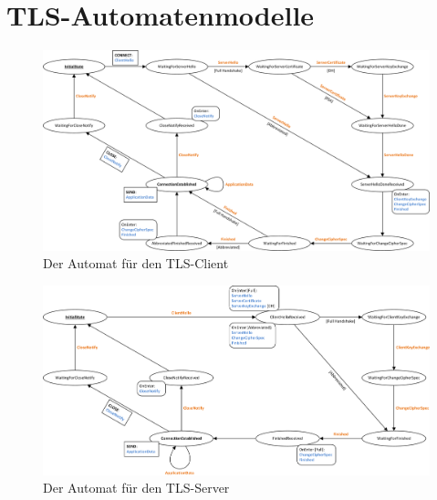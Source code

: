 \appendix

\chapter{TLS-Automatenmodelle}
\label{cha_tls_state_machines}

\begin{figure}[H]
	\centering
	\includegraphics[scale=0.75, angle = 90]{Diagrams/client_state_machine.png} %
	\caption{Der Automat für den TLS-Client}
	\label{fig_tls_client_state_machine}
\end{figure}

\begin{figure}[H]
	\centering
	\includegraphics[scale=0.75, angle = 90]{Diagrams/server_state_machine.png} %
	\caption{Der Automat für den TLS-Server}
	\label{fig_tls_server_state_machine}
\end{figure}